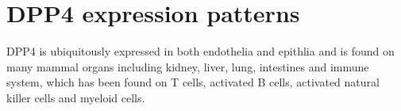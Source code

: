 \section{DPP4 expression patterns}
DPP4 is ubiquitously expressed in both endothelia and epithlia and is found on many mammal organs including kidney, liver, lung, intestines and immune system, which has been found on T cells, activated B cells, activated natural killer cells and myeloid cells.~\cite{Abbott1994,Shingu2003,Hong1989,Gutschmidt1981,Dikov2004,Bühling1995,Tanaka1992,Gorrell1991}
